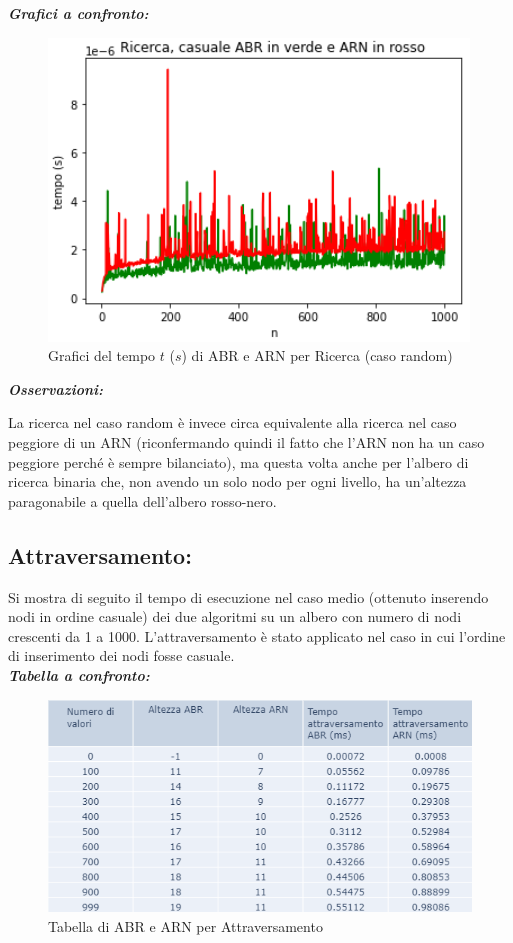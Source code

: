 \documentclass[]{article}
\begin{document}
\noindent \textit{\bf{Grafici a confronto:}}
\begin{figure}[H]
\centering
\includegraphics[width=.7\textwidth, height=.6\textheight, keepaspectratio]{GraficoRicercaCasuale}
\vspace{-5mm}
\caption{Grafici del tempo $t$ ($s$) di ABR e ARN per Ricerca (caso random)}
\label{fig:fig8}
\end{figure}

\noindent \textit{\bf{Osservazioni:}}

La ricerca nel caso random è invece circa equivalente alla ricerca nel caso peggiore di un ARN (riconfermando quindi il fatto che l'ARN non ha un caso peggiore perché è sempre bilanciato), ma questa volta anche per l'albero di ricerca binaria che, non avendo un solo nodo per ogni livello, ha un'altezza paragonabile a quella dell'albero rosso-nero.

\subsection {Attraversamento:} 
Si mostra di seguito il tempo di esecuzione nel caso medio (ottenuto inserendo nodi in ordine casuale) dei due algoritmi su un albero con numero di nodi crescenti da 1 a 1000. L'attraversamento è stato applicato nel caso in cui l'ordine di inserimento dei nodi fosse casuale. \\

\noindent \textit{\bf{Tabella a confronto:}} 
\begin{figure}[ht]
\centering
\includegraphics[]{TabellaAttraversamento}
\caption{Tabella di ABR e ARN per Attraversamento}
\label{fig:fig9}
\end{figure}
\end{document}

